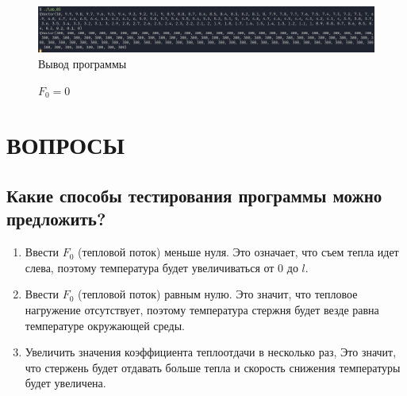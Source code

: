 \begin{figure}[H]
    \centering
    \includegraphics[scale=0.40]{img/ZeroPrint.png}
    \caption{Вывод программы}
\end{figure}

\begin{figure}[H]
    \caption{$F_0=0$}
    \label{img:noteven}
\end{figure}

\section{ВОПРОСЫ}

\subsection{Какие способы тестирования программы можно предложить?}

\begin{enumerate}
    \item Ввести $F_0$ (тепловой поток) меньше нуля. Это означает, что съем тепла идет слева, поэтому температура будет увеличиваться от $0$ до $l$.
    \item Ввести $F_0$ (тепловой поток) равным нулю. Это значит, что тепловое нагружение отсутствует, поэтому температура стержня будет везде равна температуре окружающей среды.
    \item Увеличить значения коэффициента теплоотдачи в несколько раз, Это значит, что стержень будет отдавать больше тепла и скорость снижения температуры будет увеличена.
\end{enumerate}

